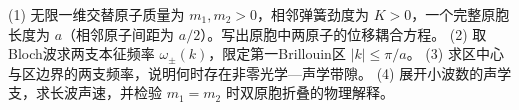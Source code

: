 (1) 无限一维交替原子质量为 \(m_1,m_2>0\)，相邻弹簧劲度为 \(K>0\)，一个完整原胞长度为 \(a\)（相邻原子间距为 \(a/2\)）。写出原胞中两原子的位移耦合方程。
(2) 取Bloch波求两支本征频率 \(\omega_\pm(k)\)，限定第一Brillouin区 \(|k|\le\pi/a\)。
(3) 求区中心与区边界的两支频率，说明何时存在非零光学—声学带隙。
(4) 展开小波数的声学支，求长波声速，并检验 \(m_1=m_2\) 时双原胞折叠的物理解释。
